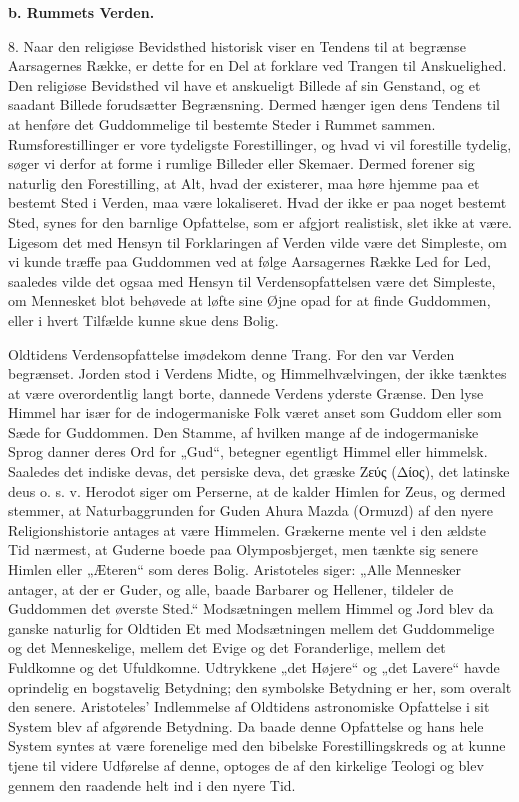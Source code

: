 \documentclass[12pt,a4paper,openany]{book}
\newcommand{\opage}[1]{\marginnote{\footnotesize\textit{[#1]}}}
\begin{document}
\begin{center}\textbf{b. Rummets Verden.}\end{center}

8. Naar den religiøse Bevidsthed historisk viser en Tendens til at
begrænse Aarsagernes Række, er dette for en Del at forklare
\opage{24}ved Trangen til Anskuelighed. Den religiøse Bevidsthed vil
have et anskueligt Billede af sin Genstand, og et saadant Billede
forudsætter Begrænsning. Dermed hænger igen dens Tendens til at henføre
det Guddommelige til bestemte Steder i Rummet sammen. Rumsforestillinger
er vore tydeligste Forestillinger, og hvad vi vil forestille tydelig,
søger vi derfor at forme i rumlige Billeder eller Skemaer. Dermed
forener sig naturlig den Forestilling, at Alt, hvad der existerer, maa
høre hjemme paa et bestemt Sted i Verden, maa være lokaliseret. Hvad der
ikke er paa noget bestemt Sted, synes for den barnlige Opfattelse, som
er afgjort realistisk, slet ikke at være. Ligesom det med Hensyn til
Forklaringen af Verden vilde være det Simpleste, om vi kunde træffe paa
Guddommen ved at følge Aarsagernes Række Led for Led, saaledes vilde det
ogsaa med Hensyn til Verdensopfattelsen være det Simpleste, om Mennesket
blot behøvede at løfte sine Øjne opad for at finde Guddommen, eller i
hvert Tilfælde kunne skue dens Bolig.

Oldtidens Verdensopfattelse imødekom denne Trang. For den var Verden
begrænset. Jorden stod i Verdens Midte, og Himmelhvælvingen, der ikke
tænktes at være overordentlig langt borte, dannede Verdens yderste
Grænse. Den lyse Himmel har især for de indogermaniske Folk været anset
som Guddom eller som Sæde for Guddommen. Den Stamme, af hvilken mange af
de indogermaniske Sprog danner deres Ord for „Gud“, betegner egentligt
Himmel eller himmelsk. Saaledes det indiske devas, det persiske deva,
det græske Ζεύς (Δίος), det latinske deus o. s. v. Herodot siger om
Perserne, at de kalder Himlen for Zeus, og dermed stemmer, at
Naturbaggrunden for Guden Ahura Mazda (Ormuzd) af den nyere
Religionshistorie antages at være Himmelen. Grækerne mente vel i den
ældste Tid nærmest, at Guderne boede paa Olymposbjerget, men tænkte sig
senere Himlen eller „Æteren“ som deres Bolig. Aristoteles siger: „Alle
Mennesker antager, at der er Guder, og alle, baade Barbarer og Hellener,
tildeler de Guddommen det øverste Sted.“ Modsætningen mellem Himmel og
Jord blev da ganske naturlig for Oldtiden Et med Modsætningen mellem det
Guddommelige og det Menneskelige, mellem det Evige og det Foranderlige,
mellem det Fuldkomne og det Ufuldkomne. Udtrykkene „det Højere“ og „det
Lavere“ havde oprindelig en bogstavelig Betydning; den symbolske
Betydning er her, som overalt den senere. Aristoteles’ Indlemmelse af
Oldtidens astronomiske Opfattelse i sit System blev af afgørende
Betydning. Da baade denne Opfattelse og hans hele System syntes at være
forenelige med den
\opage{25}bibelske Forestillingskreds og at kunne tjene til videre
Udførelse af denne, optoges de af den kirkelige Teologi og blev gennem
den raadende helt ind i den nyere Tid.
\end{document}

